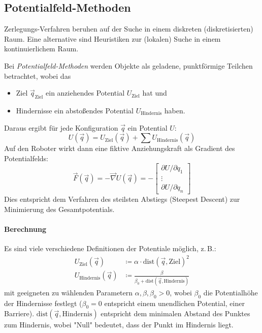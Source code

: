 		\subsection{Potentialfeld-Methoden} %
			Zerlegungs-Verfahren beruhen auf der Suche in einem diskreten (\bzw diskretisierten) Raum. Eine alternative sind Heuristiken zur (lokalen) Suche in einem kontinuierlichem Raum.
			
			Bei \emph{Potentialfeld-Methoden} werden Objekte als geladene, punktförmige Teilchen betrachtet, wobei das
			\begin{itemize}
				\item Ziel \( \vec{q}_\text{Ziel} \) ein anziehendes Potential \( U_\text{Ziel} \) hat und
				\item Hindernisse ein abstoßendes Potential \( U_\text{Hindernis} \) haben.
			\end{itemize}
			Daraus ergibt für jede Konfiguration \( \vec{q} \) ein Potential \(U\):
			\begin{equation*}
				U(\vec{q}) = U_\text{Ziel}(\vec{q}) + \sum U_\text{Hindernis}(\vec{q})
			\end{equation*}
			Auf den Roboter wirkt dann eine fiktive Anziehungskraft als Gradient des Potentialfelds:
			\begin{equation*}
				\vec{F}(\vec{q}) = -\vec{\nabla} U(\vec{q}) =
					- \begin{bmatrix}
						\partial U / \partial q_1 \\
						\vdots \\
						\partial U / \partial q_n
					\end{bmatrix}
			\end{equation*}
			Dies entspricht dem Verfahren des steilsten Abstiegs (Steepest Descent) zur Minimierung des Gesamtpotentials.
			
			\paragraph{Berechnung}
				Es sind viele verschiedene Definitionen der Potentiale möglich, z.\,B.:
				\begin{align*}
					U_\text{Ziel}(\vec{q}) &\coloneqq \alpha \cdot \text{dist}(\vec{q}, \text{Ziel})^2 \\
					U_\text{Hindernis}(\vec{q}) &\coloneqq \frac{\beta}{\beta_0 + \text{dist}(\vec{q}, \text{Hindernis})}
				\end{align*}
				mit geeigneten zu wählenden Parametern \( \alpha, \beta, \beta_0 > 0 \), wobei \( \beta_0 \) die Potentialhöhe der Hindernisse festlegt (\( \beta_0 = 0 \) entspricht einem unendlichen Potential, \dh einer Barriere). \( \text{dist}(\vec{q}, \text{Hindernis}) \) entspricht dem minimalen Abstand des Punktes zum Hindernis, wobei "Null" bedeutet, dass der Punkt im Hindernis liegt.
				
